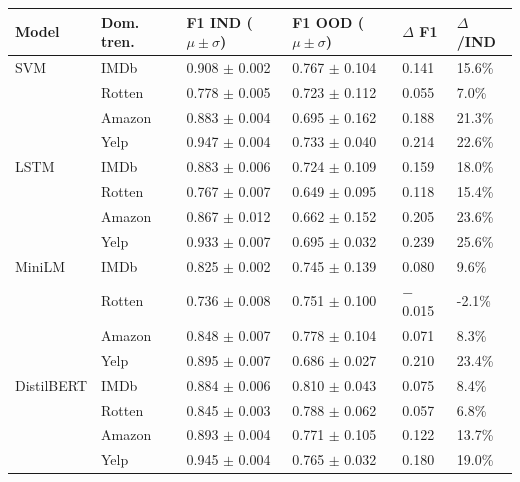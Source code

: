 \begin{tabularx}{\textwidth}{@{}llYYYY@{}}
\hline
Model & Dom. tren. & F1 IND ($\mu\pm\sigma$) & F1 OOD ($\mu\pm\sigma$) & $\Delta$ F1 & $\Delta$/IND \\
\hline
SVM & IMDb & 0.908 $\pm$ 0.002 & 0.767 $\pm$ 0.104 & 0.141 & 15.6\% \\
 & Rotten & 0.778 $\pm$ 0.005 & 0.723 $\pm$ 0.112 & 0.055 & 7.0\% \\
 & Amazon & 0.883 $\pm$ 0.004 & 0.695 $\pm$ 0.162 & 0.188 & 21.3\% \\
 & Yelp & 0.947 $\pm$ 0.004 & 0.733 $\pm$ 0.040 & 0.214 & 22.6\% \\
LSTM & IMDb & 0.883 $\pm$ 0.006 & 0.724 $\pm$ 0.109 & 0.159 & 18.0\% \\
 & Rotten & 0.767 $\pm$ 0.007 & 0.649 $\pm$ 0.095 & 0.118 & 15.4\% \\
 & Amazon & 0.867 $\pm$ 0.012 & 0.662 $\pm$ 0.152 & 0.205 & 23.6\% \\
 & Yelp & 0.933 $\pm$ 0.007 & 0.695 $\pm$ 0.032 & 0.239 & 25.6\% \\
MiniLM & IMDb & 0.825 $\pm$ 0.002 & 0.745 $\pm$ 0.139 & 0.080 & 9.6\% \\
 & Rotten & 0.736 $\pm$ 0.008 & 0.751 $\pm$ 0.100 & $-$0.015 & -2.1\% \\
 & Amazon & 0.848 $\pm$ 0.007 & 0.778 $\pm$ 0.104 & 0.071 & 8.3\% \\
 & Yelp & 0.895 $\pm$ 0.007 & 0.686 $\pm$ 0.027 & 0.210 & 23.4\% \\
DistilBERT & IMDb & 0.884 $\pm$ 0.006 & 0.810 $\pm$ 0.043 & 0.075 & 8.4\% \\
 & Rotten & 0.845 $\pm$ 0.003 & 0.788 $\pm$ 0.062 & 0.057 & 6.8\% \\
 & Amazon & 0.893 $\pm$ 0.004 & 0.771 $\pm$ 0.105 & 0.122 & 13.7\% \\
 & Yelp & 0.945 $\pm$ 0.004 & 0.765 $\pm$ 0.032 & 0.180 & 19.0\% \\
\hline
\end{tabularx}

